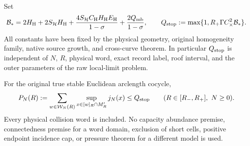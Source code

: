 Set
\begin{equation}\label{ps:source-budget}
 \mathcal B_*=
 2H_{\rm H}
 +2S_{\mathcal H}H_{\rm H}
 +{4S_{\mathcal H}C_{\rm H}H_{\rm H}E_{\rm H}\over1-\sigma}
 +{2Q_{\rm mb}\over1-\sigma},
 \qquad
 Q_{\rm stop}:=\max\{1,R_+\Gamma C_\times^2\mathcal B_*\}.
\end{equation}
All constants have been fixed by the physical geometry, original
homogeneity family, native source growth, and cross-curve theorem.
In particular $Q_{\rm stop}$ is independent of $N$, $R$, physical
word, exact record label, roof interval, and the outer parameters
of the raw local-limit problem.

\begin{theorem}
\label{ps:pressure}
For the original true stable Euclidean arclength cocycle,
\begin{equation}\label{ps:pressure-bound}
 P_N(R):=\sum_{w\in\mathcal W_N(R)}
          \sup_{x\in[w]_R\cap M_R'}j_N(x)
       \le Q_{\rm stop}
       \qquad(R\in[R_-,R_+],\ N\ge0).
\end{equation}
Every physical collision word is included.  No capacity abundance
premise, connectedness premise for a word domain, exclusion of
short cells, positive endpoint incidence cap, or pressure theorem
for a different model is used.
\end{theorem}

